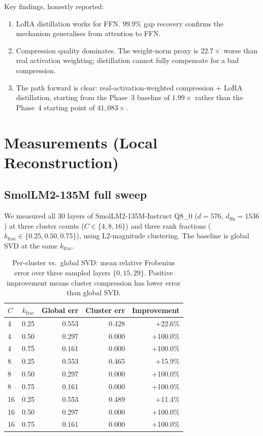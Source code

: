 \documentclass[11pt]{article}
\begin{document}
Key findings, honestly reported:
\begin{enumerate}
\item LoRA distillation works for FFN.  $99.9\%$ gap recovery
      confirms the mechanism generalises from attention to FFN.
\item Compression quality dominates.  The weight-norm proxy
      is $22.7{\times}$ worse than real activation weighting; distillation
      cannot fully compensate for a bad compression.
\item The path forward is clear: real-activation-weighted
      compression + LoRA distillation, starting from the Phase~3
      baseline of $1.99{\times}$ rather than the Phase~4 starting
      point of $41{,}083{\times}$.
\end{enumerate}

\section{Measurements (Local Reconstruction)}
\label{sec:measurements}

\subsection{SmolLM2-135M full sweep}

We measured all 30 layers of SmolLM2-135M-Instruct Q8\_0 ($d{=}576$,
$d_\text{ffn}{=}1536$) at three cluster counts ($C\in\{4,8,16\}$)
and three rank fractions ($k_\text{frac}\in\{0.25,0.50,0.75\}$),
using L2-magnitude clustering.  The baseline is global SVD at the same
$k_\text{frac}$.

\begin{table}[h]\centering\small
\caption{Per-cluster vs.\ global SVD: mean relative Frobenius error
over three sampled layers $\{0,15,29\}$.  Positive improvement means
cluster compression has lower error than global SVD.}
\label{tab:ffn-cluster}
\begin{tabular}{@{}lrrrr@{}}
\toprule
$C$ & $k_\text{frac}$ & Global err & Cluster err & Improvement \\
\midrule
4  & 0.25 & 0.553 & 0.428 & +22.6\% \\
4  & 0.50 & 0.297 & 0.000 & +100.0\% \\
4  & 0.75 & 0.161 & 0.000 & +100.0\% \\
8  & 0.25 & 0.553 & 0.465 & +15.9\% \\
8  & 0.50 & 0.297 & 0.000 & +100.0\% \\
8  & 0.75 & 0.161 & 0.000 & +100.0\% \\
16 & 0.25 & 0.553 & 0.489 & +11.4\% \\
16 & 0.50 & 0.297 & 0.000 & +100.0\% \\
16 & 0.75 & 0.161 & 0.000 & +100.0\% \\
\bottomrule
\end{tabular}
\end{table}
\end{document}
